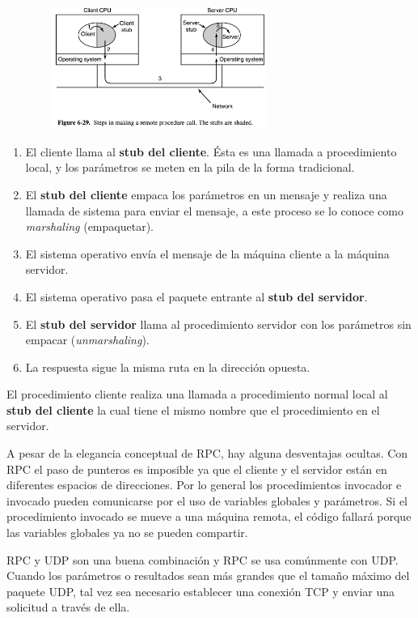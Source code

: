 \documentclass[10pt,a4paper]{report}
\begin{document}
	\begin{center}
		\includegraphics[width=10cm, height=4cm]{./imagenes/rpc.png} 
	\end{center}
	
	\begin{enumerate}
		\item El cliente llama al \textbf{stub del cliente}. Ésta es una llamada a procedimiento local, y los parámetros se meten en la pila de la forma tradicional.
		\item El \textbf{stub del cliente} empaca los parámetros en un mensaje y realiza una llamada de sistema para enviar el mensaje, a este proceso se lo conoce como \textit{marshaling} (empaquetar).
		\item El sistema operativo envía el mensaje de la máquina cliente a la máquina servidor.
		\item El sistema operativo pasa el paquete entrante al \textbf{stub del servidor}. 
		\item El \textbf{stub del servidor} llama al procedimiento servidor con los parámetros sin empacar (\textit{unmarshaling}).
		\item La respuesta sigue la misma ruta en la dirección opuesta.
	\end{enumerate}
	
	\par El procedimiento cliente realiza una llamada a procedimiento normal local al \textbf{stub del cliente} la cual tiene el mismo nombre que el procedimiento en el servidor.
	
	\par A pesar de la elegancia conceptual de RPC, hay alguna desventajas ocultas. Con RPC el paso de punteros es imposible ya que el cliente y el servidor están en diferentes espacios de direcciones. Por lo general los procedimientos invocador e invocado pueden comunicarse por el uso de variables globales y parámetros. Si el procedimiento invocado se mueve a una máquina remota, el código fallará porque las variables globales ya no se pueden compartir.


	\par RPC y UDP son una buena combinación y RPC se usa comúnmente con UDP.  Cuando los parámetros o resultados sean más grandes que el tamaño máximo del paquete UDP, tal vez sea necesario establecer una conexión TCP y enviar una solicitud a través de ella.
\end{document}
